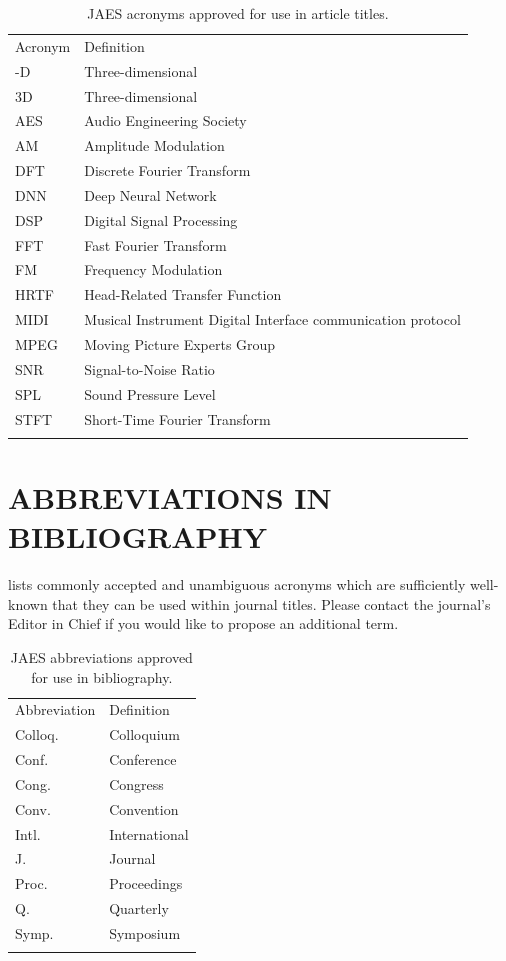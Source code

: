 \documentclass[fleqn]{jaes}
\begin{document}
\begin{table}[!ht]
    \caption{JAES acronyms approved for use in article titles.}\label{table:acronyms}
    \begin{tabular}{@{}ll@{}}
    \toprule
        Acronym & Definition \\
    \colrule
        3-D & Three-dimensional \\
        3D & Three-dimensional \\
        AES & Audio Engineering Society \\
        AM & Amplitude Modulation \\
        DFT & Discrete Fourier Transform \\
        DNN & Deep Neural Network \\
        DSP & Digital Signal Processing \\
        FFT & Fast Fourier Transform \\
        FM & Frequency Modulation \\
        HRTF & Head-Related Transfer Function \\
        MIDI & Musical Instrument Digital Interface communication protocol \\
        MPEG & Moving Picture Experts Group \\
        SNR & Signal-to-Noise Ratio \\
        SPL & Sound Pressure Level \\
        STFT & Short-Time Fourier Transform \\
    \botrule
    \end{tabular}
\end{table}

\section{\MakeUppercase{Abbreviations in bibliography}}\label{sec:abbreviations}

 lists commonly accepted and unambiguous acronyms which are sufficiently well-known that they can be used within journal titles. Please contact the journal's Editor in Chief if you would like to propose an additional term. 

\begin{table}[!ht]
    \caption{JAES abbreviations approved for use in bibliography.}\label{table:abbrev}
    \begin{tabular}{@{}ll@{}}
    \toprule
        Abbreviation & Definition \\
    \colrule
        Colloq. & Colloquium \\
        Conf. & Conference \\
        Cong. & Congress \\
        Conv. & Convention \\
        Intl. & International \\
        J. & Journal \\
        Proc. & Proceedings \\
        Q. & Quarterly \\
        Symp. & Symposium \\
    \botrule
    \end{tabular}
\end{table}
\end{document}
